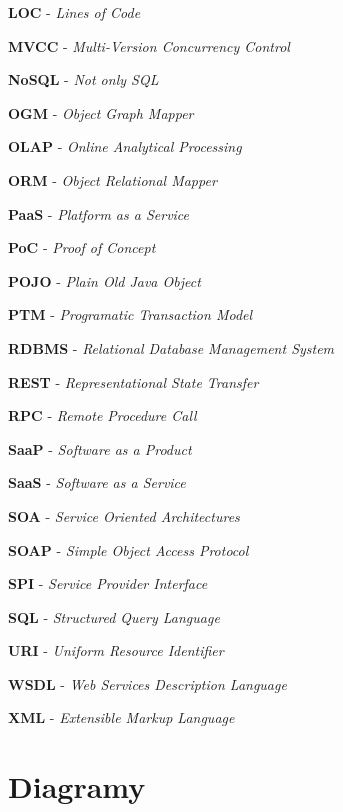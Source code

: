 \documentclass[11pt,twoside,a4paper]{book}
\begin{document}
\textbf{LOC} - \textit{Lines of Code}

\textbf{MVCC} - \textit{Multi-Version Concurrency Control}

\textbf{NoSQL} - \textit{Not only SQL}

\textbf{OGM} - \textit{Object Graph Mapper}

\textbf{OLAP} - \textit{Online Analytical Processing}

\textbf{ORM} - \textit{Object Relational Mapper}

\textbf{PaaS} - \textit{Platform as a Service}

\textbf{PoC} - \textit{Proof of Concept}

\textbf{POJO} - \textit{Plain Old Java Object}

\textbf{PTM} - \textit{Programatic Transaction Model}

\textbf{RDBMS} - \textit{Relational Database Management System}

\textbf{REST} - \textit{Representational State Transfer}

\textbf{RPC} - \textit{Remote Procedure Call}

\textbf{SaaP} - \textit{Software as a Product}

\textbf{SaaS} - \textit{Software as a Service}

\textbf{SOA} - \textit{Service Oriented Architectures}

\textbf{SOAP} - \textit{Simple Object Access Protocol}

\textbf{SPI} - \textit{Service Provider Interface}

\textbf{SQL} - \textit{Structured Query Language}

\textbf{URI} - \textit{Uniform Resource Identifier}

\textbf{WSDL} - \textit{Web Services Description Language}

\textbf{XML} - \textit{Extensible Markup Language}


\chapter{Diagramy}
\end{document}
